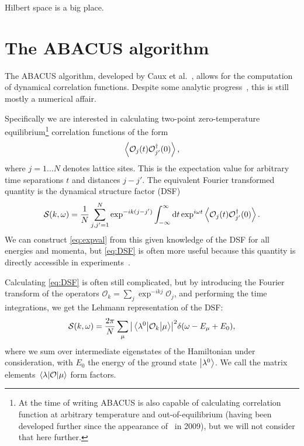 \documentclass[11pt, a4paper]{report} %
\begin{document}
\begin{savequote}[50mm]
Hilbert space is a big place.
\end{savequote}


\chapter{The ABACUS algorithm}\label{chap:abacus}

The ABACUS algorithm, developed by Caux et al.~\cite{Caux2005, Caux2007, Caux2007a, Caux2005a}, allows for the computation of dynamical correlation functions.
Despite some analytic progress~\cite{Nardis2016,Nardis2015,slavnov90_noneq_time_curren_correl_funct}, this is still mostly a numerical affair.

Specifically we are interested in calculating two-point zero-temperature equilibrium\footnote{At the time of writing ABACUS is also capable of calculating correlation function at arbitrary temperature and out-of-equilibrium (having been developed further since the appearance of~\cite{Caux2009} in 2009), but we will not consider that here further.} correlation functions of the form
\begin{equation}\label{eq:expval}
	\expval{\mathcal{O}_j(t)\mathcal{O}_{j'}^{\dagger}(0)},
\end{equation}
where \(j=1\ldots N\) denotes lattice sites.
This is the expectation value for arbitrary time separations $t$ and distances $j-j'$.
The equivalent Fourier transformed quantity is the dynamical structure factor (DSF)
\begin{equation}\label{eq:DSF}
	\mathcal{S}(k,\omega) = \frac{1}{N} \sum_{j,j'=1}^{N} \exp^{-ik(j-j')} \int_{-\infty}^{\infty}\dd t \exp^{i\omega t}\expval{\mathcal{O}_j(t)\mathcal{O}_{j'}^{\dagger}(0)}.
\end{equation}
We can construct \cref{eq:expval} from this given knowledge of the DSF for all energies and momenta, but \cref{eq:DSF} is often more useful because this quantity is directly accessible in experiments~\cite{Caux2009,Caux2007a}.

Calculating \cref{eq:DSF} is often still complicated, but by introducing the Fourier transform of the operators $\mathcal{O}_k=\sum_j \exp^{-ikj} \mathcal{O}_j$, and performing the time integrations, we get the Lehmann representation of the DSF:\@
\begin{equation}
  \label{eq:lehman}
  \mathcal{S}(k,\omega) = \frac{2\pi}{N}\sum_{\mu}\abs{\mel{\lambda^0}{\mathcal{O}_k}{\mu}}^2 \delta\qty(\omega-E_{\mu}+E_0), 
\end{equation}
where we sum over intermediate eigenstates of the Hamiltonian under consideration, with $E_0$ the energy of the ground state $\ket{\lambda^0}$.
We call the matrix elements $\mel{\lambda}{\mathcal{O}}{\mu}$ form factors.
\end{document}
